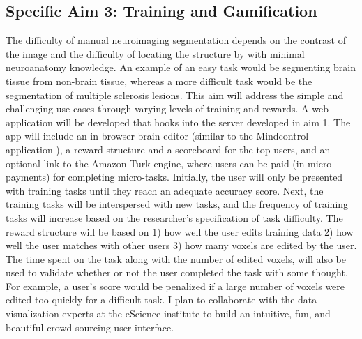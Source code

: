 

\subsection*{Specific Aim 3: Training and Gamification}

The difficulty of manual neuroimaging segmentation depends on the contrast of the image and the difficulty of locating the structure by with minimal neuroanatomy knowledge. An example of an easy task would be segmenting brain tissue from non-brain tissue, whereas a more difficult task would be the segmentation of multiple sclerosis lesions. This aim will address the simple and challenging use cases through varying levels of training and rewards. A web application will be developed that hooks into the server developed in aim 1. The app will include an in-browser brain editor (similar to the Mindcontrol application \cite{keshavan2016mindcontrol}), a reward structure and a scoreboard for the top users, and an optional link to the Amazon Turk engine, where users can be paid (in micro-payments) for completing micro-tasks. Initially, the user will only be presented with training tasks until they reach an adequate accuracy score. Next, the training tasks will be interspersed with new tasks, and the frequency of training tasks will increase based on the researcher's specification of task difficulty. The reward structure will be based on 1) how well the user edits training data 2) how well the user matches with other users 3) how many voxels are edited by the user. The time spent on the task along with the number of edited voxels, will also be used to validate whether or not the user completed the task with some thought. For example, a user's score would be penalized if a large number of voxels were edited too quickly for a difficult task. I plan to collaborate with the data visualization experts at the eScience institute to build an intuitive, fun, and beautiful crowd-sourcing user interface.